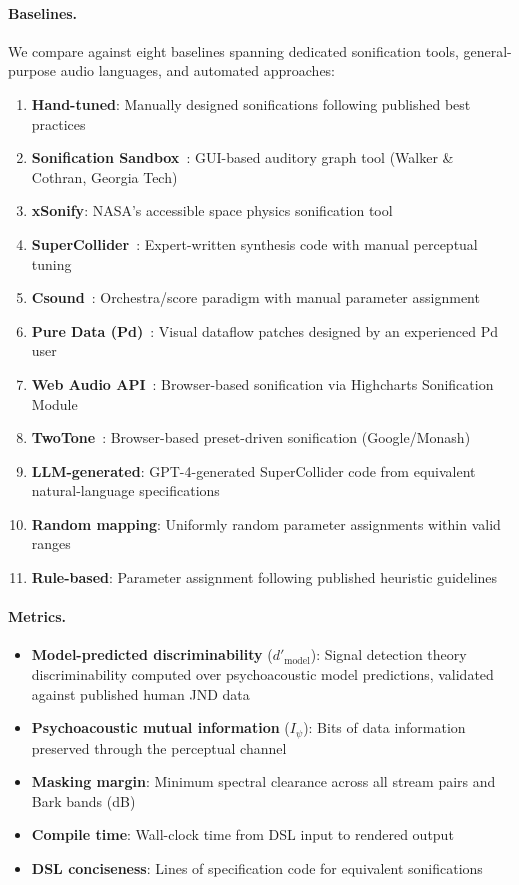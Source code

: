 \documentclass[sigchi, nonacm]{acmart}
\begin{document}
\paragraph{Baselines.} We compare against eight baselines spanning dedicated sonification tools, general-purpose audio languages, and automated approaches:
\begin{enumerate}
    \item \textbf{Hand-tuned}: Manually designed sonifications following published best practices~\cite{walker2011theory, hermann2011sonification}
    \item \textbf{Sonification Sandbox}~\cite{walker2003sonificationsandbox}: GUI-based auditory graph tool (Walker \& Cothran, Georgia Tech)
    \item \textbf{xSonify}: NASA's accessible space physics sonification tool
    \item \textbf{SuperCollider}~\cite{mccartney2002rethinking}: Expert-written synthesis code with manual perceptual tuning
    \item \textbf{Csound}~\cite{boulanger2000csound}: Orchestra/score paradigm with manual parameter assignment
    \item \textbf{Pure Data (Pd)}~\cite{puckette1996pure}: Visual dataflow patches designed by an experienced Pd user
    \item \textbf{Web Audio API}~\cite{webaudioapi}: Browser-based sonification via Highcharts Sonification Module~\cite{highcharts2022}
    \item \textbf{TwoTone}~\cite{twotone2020}: Browser-based preset-driven sonification (Google/Monash)
    \item \textbf{LLM-generated}: GPT-4-generated SuperCollider code from equivalent natural-language specifications
    \item \textbf{Random mapping}: Uniformly random parameter assignments within valid ranges
    \item \textbf{Rule-based}: Parameter assignment following published heuristic guidelines~\cite{walker2011theory}
\end{enumerate}

\paragraph{Metrics.}
\begin{itemize}
    \item \textbf{Model-predicted discriminability} ($d'_\mathrm{model}$): Signal detection theory discriminability computed over psychoacoustic model predictions, validated against published human JND data~\cite{moore2012introduction}
    \item \textbf{Psychoacoustic mutual information} ($I_\psi$): Bits of data information preserved through the perceptual channel
    \item \textbf{Masking margin}: Minimum spectral clearance across all stream pairs and Bark bands (dB)
    \item \textbf{Compile time}: Wall-clock time from DSL input to rendered output
    \item \textbf{DSL conciseness}: Lines of specification code for equivalent sonifications
\end{itemize}
\end{document}
